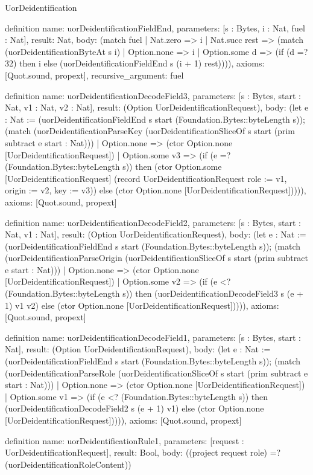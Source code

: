 \begin{lexlean}{UorDeidentification}
\begin{semanticmodule}
definition{
  name: uorDeidentificationFieldEnd,
  parameters: [s : Bytes, i : Nat, fuel : Nat],
  result: Nat,
  body: (match fuel
    | Nat.zero => i
    | Nat.succ rest => (match (uorDeidentificationByteAt s i)
      | Option.none => i
      | Option.some d => (if (d =? 32) then i else (uorDeidentificationFieldEnd s (i + 1) rest)))),
  axioms: [Quot.sound, propext],
  recursive_argument: fuel
}

definition{
  name: uorDeidentificationDecodeField3,
  parameters: [s : Bytes, start : Nat, v1 : Nat, v2 : Nat],
  result: (Option UorDeidentificationRequest),
  body: (let e : Nat := (uorDeidentificationFieldEnd s start (Foundation.Bytes::byteLength s)); (match (uorDeidentificationParseKey (uorDeidentificationSliceOf s start (prim subtract e start : Nat)))
    | Option.none => (ctor Option.none [UorDeidentificationRequest])
    | Option.some v3 => (if (e =? (Foundation.Bytes::byteLength s)) then (ctor Option.some [UorDeidentificationRequest] (record UorDeidentificationRequest {role := v1, origin := v2, key := v3})) else (ctor Option.none [UorDeidentificationRequest])))),
  axioms: [Quot.sound, propext]
}

definition{
  name: uorDeidentificationDecodeField2,
  parameters: [s : Bytes, start : Nat, v1 : Nat],
  result: (Option UorDeidentificationRequest),
  body: (let e : Nat := (uorDeidentificationFieldEnd s start (Foundation.Bytes::byteLength s)); (match (uorDeidentificationParseOrigin (uorDeidentificationSliceOf s start (prim subtract e start : Nat)))
    | Option.none => (ctor Option.none [UorDeidentificationRequest])
    | Option.some v2 => (if (e <? (Foundation.Bytes::byteLength s)) then (uorDeidentificationDecodeField3 s (e + 1) v1 v2) else (ctor Option.none [UorDeidentificationRequest])))),
  axioms: [Quot.sound, propext]
}

definition{
  name: uorDeidentificationDecodeField1,
  parameters: [s : Bytes, start : Nat],
  result: (Option UorDeidentificationRequest),
  body: (let e : Nat := (uorDeidentificationFieldEnd s start (Foundation.Bytes::byteLength s)); (match (uorDeidentificationParseRole (uorDeidentificationSliceOf s start (prim subtract e start : Nat)))
    | Option.none => (ctor Option.none [UorDeidentificationRequest])
    | Option.some v1 => (if (e <? (Foundation.Bytes::byteLength s)) then (uorDeidentificationDecodeField2 s (e + 1) v1) else (ctor Option.none [UorDeidentificationRequest])))),
  axioms: [Quot.sound, propext]
}

definition{
  name: uorDeidentificationRule1,
  parameters: [request : UorDeidentificationRequest],
  result: Bool,
  body: ((project request role) =? (uorDeidentificationRoleContent))
}


\end{semanticmodule}
\end{lexlean}
